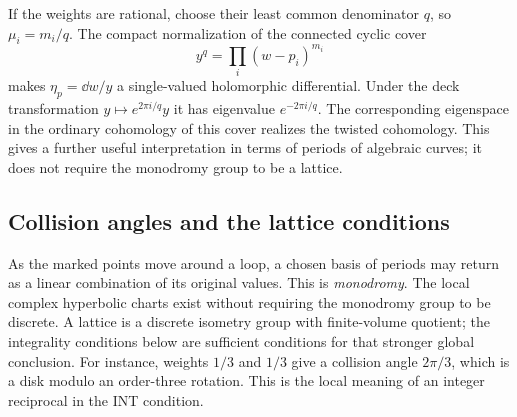 If the weights are rational, choose their least common denominator
$q$, so $\mu_i=m_i/q$. The compact normalization of the connected cyclic
cover
\[
 y^q=\prod_i(w-p_i)^{m_i}
\]
makes $\eta_p=\dd w/y$ a single-valued holomorphic differential. Under
the deck transformation $y\mapsto e^{2\pi i/q}y$ it has eigenvalue
$e^{-2\pi i/q}$. The corresponding eigenspace in the ordinary
cohomology of this cover realizes the twisted cohomology. This gives a
further useful interpretation in terms of periods of algebraic curves;
it does not require the monodromy group to be a lattice.

\subsection{Collision angles and the lattice conditions}

As the marked points move around a loop, a chosen basis of periods
may return as a linear combination of its original values. This
is \emph{monodromy}. The local complex hyperbolic charts exist
without requiring the monodromy group to be discrete. A lattice
is a discrete isometry group with finite-volume quotient; the
integrality conditions below are sufficient conditions for that
stronger global conclusion. For instance, weights $1/3$ and
$1/3$ give a collision angle $2\pi/3$, which is a disk modulo
an order-three rotation. This is the local meaning of an integer
reciprocal in the INT condition.

